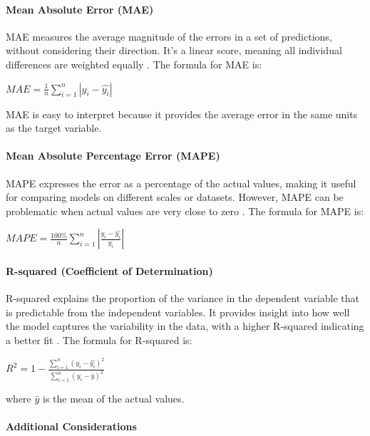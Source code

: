 \documentclass[11pt,a4paper,]{article}
\begin{document}
\paragraph{Mean Absolute Error (MAE)}\label{mean-absolute-error-mae}

MAE measures the average magnitude of the errors in a set of predictions, without considering their direction. It's a linear score, meaning all individual differences are weighted equally \autocite{ISLR,Hastie09}. The formula for MAE is:

\(MAE = \frac{1}{n} {\sum^n_{i=1}|y_i-\hat{y_i}|}\)

MAE is easy to interpret because it provides the average error in the same units as the target variable.

\paragraph{Mean Absolute Percentage Error (MAPE)}\label{mean-absolute-percentage-error-mape}

MAPE expresses the error as a percentage of the actual values, making it useful for comparing models on different scales or datasets. However, MAPE can be problematic when actual values are very close to zero \autocite{ISLR,Hastie09}. The formula for MAPE is:

\(MAPE = \frac{100\%}{n} {\sum^n_{i=1}|\frac{y_i-\hat{y_i}}{y_i}|}\)

\paragraph{R-squared (Coefficient of Determination)}\label{r-squared-coefficient-of-determination}

R-squared explains the proportion of the variance in the dependent variable that is predictable from the independent variables. It provides insight into how well the model captures the variability in the data, with a higher R-squared indicating a better fit \autocite{ISLR,Hastie09}. The formula for R-squared is:

\(R^2 = 1-\frac{\sum^n_{i=1}(y_i-\hat{y_i})^2}{\sum^n_{i=1}(y_i-\bar{y})^2}\)

where \(\bar{y}\) is the mean of the actual values.

\paragraph{Additional Considerations}\label{additional-considerations}
\end{document}
